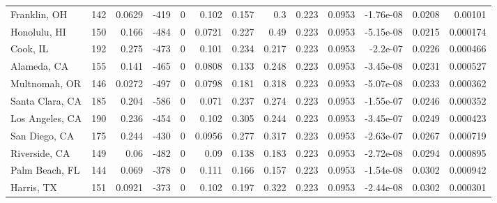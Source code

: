\documentclass[12pt,letterpaper]{article}
\begin{document}
\begin{appendices}
\begin{sidewaystable}
{\begin{tabular}{lrrrrrrrrrrrr}
 Franklin, OH       & 142   & 0.0629  & -419   &     0 &          0.102  &            0.157 &         0.3    &        0.223 &       0.0953 &        -1.76e-08 &           0.0208  &        0.00101  \\
 Honolulu, HI       & 150   & 0.166   & -484   &     0 &          0.0721 &            0.227 &         0.49   &        0.223 &       0.0953 &        -5.15e-08 &           0.0215  &        0.000174 \\
 Cook, IL           & 192   & 0.275   & -473   &     0 &          0.101  &            0.234 &         0.217  &        0.223 &       0.0953 &        -2.2e-07  &           0.0226  &        0.000466 \\
 Alameda, CA        & 155   & 0.141   & -465   &     0 &          0.0808 &            0.133 &         0.248  &        0.223 &       0.0953 &        -3.45e-08 &           0.0231  &        0.000527 \\
 Multnomah, OR      & 146   & 0.0272  & -497   &     0 &          0.0798 &            0.181 &         0.318  &        0.223 &       0.0953 &        -5.07e-08 &           0.0233  &        0.000362 \\
 Santa Clara, CA    & 185   & 0.204   & -586   &     0 &          0.071  &            0.237 &         0.274  &        0.223 &       0.0953 &        -1.55e-07 &           0.0246  &        0.000352 \\
 Los Angeles, CA    & 190   & 0.236   & -454   &     0 &          0.102  &            0.305 &         0.244  &        0.223 &       0.0953 &        -3.45e-07 &           0.0249  &        0.000423 \\
 San Diego, CA      & 175   & 0.244   & -430   &     0 &          0.0956 &            0.277 &         0.317  &        0.223 &       0.0953 &        -2.63e-07 &           0.0267  &        0.000719 \\
 Riverside, CA      & 149   & 0.06    & -482   &     0 &          0.09   &            0.138 &         0.183  &        0.223 &       0.0953 &        -2.72e-08 &           0.0294  &        0.000895 \\
 Palm Beach, FL     & 144   & 0.069   & -378   &     0 &          0.111  &            0.166 &         0.157  &        0.223 &       0.0953 &        -1.54e-08 &           0.0302  &        0.000942 \\
 Harris, TX         & 151   & 0.0921  & -373   &     0 &          0.102  &            0.197 &         0.322  &        0.223 &       0.0953 &        -2.44e-08 &           0.0302  &        0.000301 \\

\end{tabular}}
\end{sidewaystable}
\end{appendices}
\end{document}
